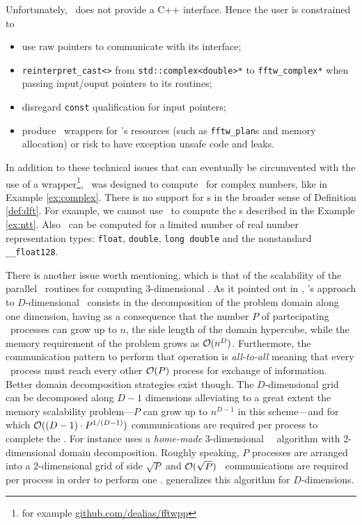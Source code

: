 Unfortunately, \fftw\ does not provide a C++ interface.
Hence the user is constrained to 
\begin{itemize}
    \item use raw pointers to communicate with its interface;
    \item \verb|reinterpret_cast<>| from
    \verb|std::complex<double>*| to \verb|fftw_complex*| when passing input/ouput
    pointers to its routines;
    \item disregard \verb|const| qualification for input pointers;
    \item produce \raii\ wrappers for \fftw's resources (such as
    \verb|fftw_plan|s and memory allocation) or risk to have exception unsafe
    code and leaks.
\end{itemize}
In addition to these technical issues that can eventually be circumvented with
the use of a wrapper\footnote{for example \url{github.com/dealias/fftwpp}},
\fftw\ was designed to compute \dft\ for
complex numbers, like in Example \ref{ex:complex}. 
There is no support for \dft{}s in the broader sense of Definition \ref{def:dft}.
For example, we cannot use \fftw\ to compute the \ntt{}s described in the
Example \ref{ex:ntt}. Also \dft\ can be computed for a limited number of real
number representation types: \verb|float|, \verb|double|, \verb|long double|
and the nonstandard \verb|__float128|.

There is another issue worth mentioning, which is that of the scalability of the
parallel \mpi\ routines for computing $3$-dimensional \dft. As it pointed out in
\cite{springel_2020,adamek_2016,pippig_13}, \fftw's approach to
$D$-dimensional
\dft\ consists in the
decomposition of the problem domain along one dimension, having as a consequence that
the number $P$ of partecipating \mpi\ processes can grow up to $n$, the side length
of the domain hypercube, while the memory requirement of the problem grows as
$\mathcal{O}(n^D)$. Furthermore, the communication pattern to perform that operation
is \emph{all-to-all} meaning that every \mpi\ process must reach every other
$\mathcal{O}(P)$ process for exchange of information.
Better domain decomposition strategies
exist though. The $D$-dimensional grid can be decomposed along $D-1$ dimensions
alleviating to a great extent the memory scalability problem---$P$ can grow up
to $n^{D-1}$ in this scheme---and for which
$\mathcal{O}((D-1)\cdot P^{1/(D-1)})$ communications are required per process to
complete the \dft. For instance \cite{adamek_2016} uses a \emph{home-made}
3-dimensional \mpi\ \fft\ algorithm with 2-dimensional domain decomposition.
Roughly speaking, $P$ processes are arranged into a 2-dimensional grid of side
$\sqrt{P}$ and $\mathcal{O}(\sqrt{P})$ \mpi\ communications are required per
process in order to perform one \dft. \cite{pippig_13} generalizes this
algorithm for $D$-dimensions.
